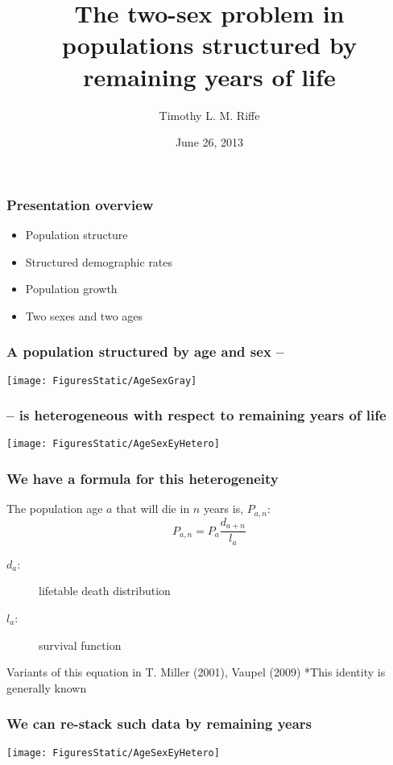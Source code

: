 \documentclass{beamer}
\title{The two-sex problem in populations structured by remaining years of life}
\author[Tim Riffe]{Timothy L. M. Riffe}
\institute[UAB]{
  Department of Geography \\
  Universitat Aut\`{o}noma de Barcelona \\
  Centre d'Estudis Demogr\`{a}fics \\
}
\date{June 26, 2013}
\begin{document}
\begin{frame}
  \titlepage
\end{frame}
\begin{frame}
  \frametitle{Presentation overview}

\begin{itemize}
  \pause \item Population structure
  \pause \item Structured demographic rates
  \pause \item Population growth
  \pause \item Two sexes and two ages
\end{itemize}

\end{frame}
\begin{frame}
\frametitle{A population structured by age and sex --}
\texttt{[image: FiguresStatic/AgeSexGray]}
\end{frame}
\begin{frame}
\frametitle{-- is heterogeneous with respect to remaining years of life}
\texttt{[image: FiguresStatic/AgeSexEyHetero]}
\end{frame}
\begin{frame}
\frametitle{We have a formula for this heterogeneity}
The population age $a$ that will die in $n$ years is, $P_{a,n}$:
 \begin{equation}
   P_{a,n} = P_a \frac{d_{a+n}}{l_a}
 \end{equation}
 \begin{description}
 \item[$d_a$:] lifetable death distribution 
 \item[$l_a$:] survival function
 \end{description}
\pause 

Variants of this equation in T. Miller (2001), Vaupel (2009)
*This identity is generally known
\end{frame}

\begin{frame}
\frametitle{We can re-stack such data by remaining years}
\texttt{[image: FiguresStatic/AgeSexEyHetero]}
\end{frame}
\end{document}
